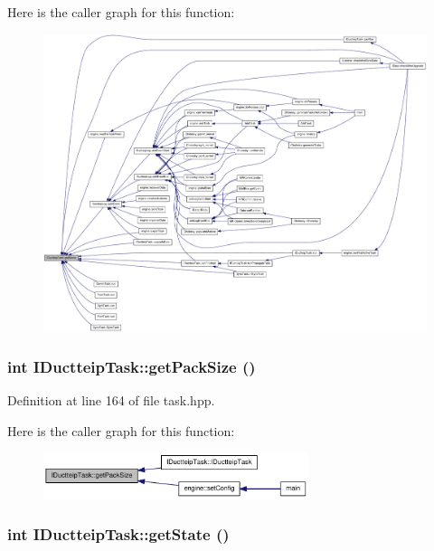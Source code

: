 Here is the caller graph for this function:\nopagebreak
\begin{figure}[H]
\begin{center}
\leavevmode
\includegraphics[width=420pt]{class_i_ductteip_task_aff428fcafc7ce7f6aa9f281febead30a_icgraph}
\end{center}
\end{figure}
\hypertarget{class_i_ductteip_task_ae517fed47c21ca466216d17ece9ab41c}{
\subsubsection[{getPackSize}]{\setlength{\rightskip}{0pt plus 5cm}int IDuctteipTask::getPackSize ()}}
\label{class_i_ductteip_task_ae517fed47c21ca466216d17ece9ab41c}


Definition at line 164 of file task.hpp.

Here is the caller graph for this function:\nopagebreak
\begin{figure}[H]
\begin{center}
\leavevmode
\includegraphics[width=220pt]{class_i_ductteip_task_ae517fed47c21ca466216d17ece9ab41c_icgraph}
\end{center}
\end{figure}
\hypertarget{class_i_ductteip_task_a7422e06ba861c73d6e00907a4f905aef}{
\subsubsection[{getState}]{\setlength{\rightskip}{0pt plus 5cm}int IDuctteipTask::getState ()}}
\label{class_i_ductteip_task_a7422e06ba861c73d6e00907a4f905aef}


